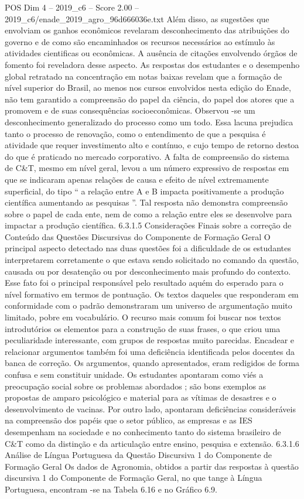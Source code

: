 \begin{textsample}{POS Dim 4 – 2019\_c6 – Score 2.00 – 2019\_c6/enade\_2019\_agro\_96d666036e.txt}
Além disso, as sugestões que envolviam os ganhos econômicos revelaram desconhecimento das atribuições do governo e de como são encaminhados os recursos necessários ao estímulo às atividades cientificas ou econômicas.
A ausência de citações envolvendo órgãos de fomento foi reveladora desse aspecto.
As respostas dos estudantes e o desempenho global retratado na concentração em notas baixas revelam que a formação de nível superior do Brasil, ao menos nos cursos envolvidos nesta edição do Enade, não tem garantido a compreensão do papel da ciência, do papel dos atores que a promovem e de suas consequências socioeconômicas.
Observou -se um desconhecimento generalizado do processo como um todo.
Essa lacuna prejudica tanto o processo de renovação, como o entendimento de que a pesquisa é atividade que requer investimento alto e contínuo, e cujo tempo de retorno destoa do que é praticado no mercado corporativo.
A falta de compreensão do sistema de C\&T, mesmo em nível geral, levou a um número expressivo de respostas em que se indicaram apenas relações de causa e efeito de nível extremamente superficial, do tipo “ a relação entre A e B impacta positivamente a produção científica aumentando as pesquisas ”.
Tal resposta não demonstra compreensão sobre o papel de cada ente, nem de como a relação entre eles se desenvolve para impactar a produção científica. 6.3.1.5 Considerações Finais sobre a correção de Conteúdo das Questões Discursivas do Componente de Formação Geral O principal aspecto detectado nas duas questões foi a dificuldade de os estudantes interpretarem corretamente o que estava sendo solicitado no comando da questão, causada ou por desatenção ou por desconhecimento mais profundo do contexto.
Esse fato foi o principal responsável pelo resultado aquém do esperado para o nível formativo em termos de pontuação.
Os textos daqueles que responderam em conformidade com o padrão demonstraram um universo de argumentação muito limitado, pobre em vocabulário.
O recurso mais comum foi buscar nos textos introdutórios os elementos para a construção de suas frases, o que criou uma peculiaridade interessante, com grupos de respostas muito parecidas.
Encadear e relacionar argumentos também foi uma deficiência identificada pelos docentes da banca de correção.
Os argumentos, quando apresentados, eram redigidos de forma confusa e sem constituir unidade.
Os estudantes apontaram como viés a preocupação social sobre os problemas abordados ; são bons exemplos as propostas de amparo psicológico e material para as vítimas de desastres e o desenvolvimento de vacinas.
Por outro lado, apontaram deficiências consideráveis na compreensão dos papéis que o setor público, as empresas e as IES desempenham na sociedade e no conhecimento tanto do sistema brasileiro de C\&T como da distinção e da articulação entre ensino, pesquisa e extensão. 6.3.1.6 Análise de Língua Portuguesa da Questão Discursiva 1 do Componente de Formação Geral Os dados de Agronomia, obtidos a partir das respostas à questão discursiva 1 do Componente de Formação Geral, no que tange à Língua Portuguesa, encontram -se na Tabela 6.16 e no Gráfico 6.9.

\end{textsample}
